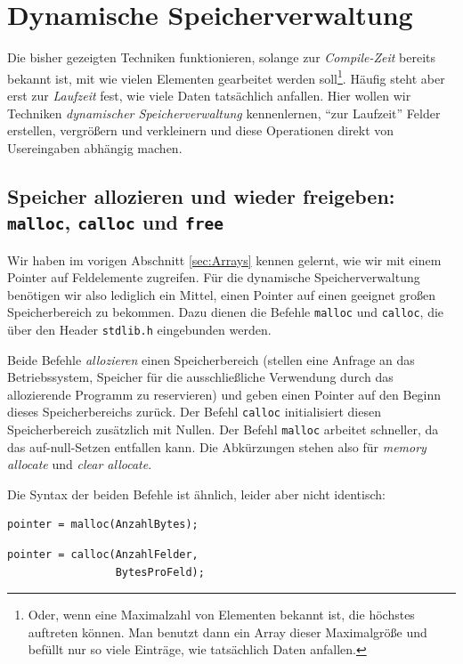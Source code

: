 \section{Dynamische Speicherverwaltung} \label{sec:dynArrays}
Die bisher gezeigten Techniken funktionieren, solange zur \emph{Compile-Zeit} bereits bekannt ist, mit wie vielen Elementen gearbeitet werden soll\footnote{Oder, wenn eine Maximalzahl von Elementen bekannt ist, die höchstes auftreten können. Man benutzt dann ein Array dieser Maximalgröße und befüllt nur so viele Einträge, wie tatsächlich Daten anfallen.}. Häufig steht aber erst zur \emph{Laufzeit} fest, wie viele Daten tatsächlich anfallen. Hier wollen wir Techniken \emph{dynamischer Speicherverwaltung} kennenlernen, \ie \enquote{zur Laufzeit} Felder erstellen, vergrößern und verkleinern und diese Operationen direkt von Usereingaben abhängig machen.

\subsection{Speicher allozieren und wieder freigeben: \texttt{malloc}, \texttt{calloc} und \texttt{free}}
\label{sec:allocation}
Wir haben im vorigen Abschnitt \ref{sec:Arrays} kennen gelernt, wie wir mit einem Pointer auf Feldelemente zugreifen. Für die dynamische Speicherverwaltung benötigen wir also lediglich ein Mittel, einen Pointer auf einen geeignet großen Speicherbereich zu bekommen. Dazu dienen die Befehle \texttt{malloc} und \texttt{calloc}, die über den Header \texttt{stdlib.h} eingebunden werden.

Beide Befehle \emph{allozieren} einen Speicherbereich (\ie stellen eine Anfrage an das Betriebssystem, Speicher für die ausschließliche Verwendung durch das allozierende Programm zu reservieren) und geben einen Pointer auf den Beginn dieses Speicherbereichs zurück. Der Befehl \texttt{calloc} initialisiert diesen Speicherbereich zusätzlich mit Nullen. Der Befehl \texttt{malloc} arbeitet schneller, da das auf-null-Setzen entfallen kann. Die Abkürzungen stehen also für \emph{memory allocate} und \emph{clear allocate}.

Die Syntax der beiden Befehle ist ähnlich, leider aber nicht identisch:
\begin{tcbraster}[raster columns=2,
                  raster equal height,
                  nobeforeafter,
                  raster column skip=0.5cm]
\begin{codebox}
\begin{verbatim}
pointer = malloc(AnzahlBytes);
\end{verbatim}
\end{codebox}
%
\begin{codebox}
\begin{verbatim}
pointer = calloc(AnzahlFelder,
                 BytesProFeld);
\end{verbatim}
\end{codebox}
\end{tcbraster}

